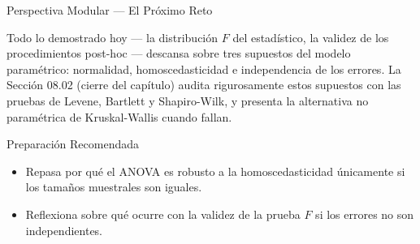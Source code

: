 \documentclass[10pt, aspectratio=169]{beamer}
\begin{document}
\begin{frame}{Perspectiva Modular --- El Próximo Reto}
  \scriptsize
  \begin{retoclase}
    Todo lo demostrado hoy --- la distribución $F$ del estadístico, la validez de los procedimientos post-hoc --- descansa sobre tres supuestos del modelo paramétrico: normalidad, homoscedasticidad e independencia de los errores. La Sección 08.02 (cierre del capítulo) audita rigurosamente estos supuestos con las pruebas de Levene, Bartlett y Shapiro-Wilk, y presenta la alternativa no paramétrica de Kruskal-Wallis cuando fallan.
  \end{retoclase}

  \vspace{0.08cm}
  \pause
  \begin{alertblock}{Preparación Recomendada}
    \begin{itemize}\itemsep=0.06cm
      \item Repasa por qué el ANOVA es robusto a la homoscedasticidad únicamente si los tamaños muestrales son iguales.
      \item Reflexiona sobre qué ocurre con la validez de la prueba $F$ si los errores no son independientes.
    \end{itemize}
  \end{alertblock}
\end{frame}
\end{document}
